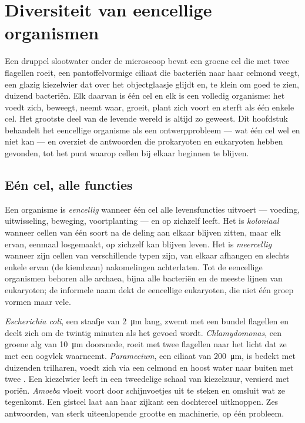 \chapter{Diversiteit van eencellige organismen}\label{ch:b2:unicellular-diversity}

Een druppel slootwater onder de microscoop bevat een groene cel die met
twee flagellen roeit, een pantoffelvormige ciliaat die bacteriën naar
haar celmond veegt, een glazig kiezelwier dat over het objectglaasje
glijdt en, te klein om goed te zien, duizend bacteriën. Elk daarvan is
één cel en elk is een volledig organisme: het voedt zich, beweegt,
neemt waar, groeit, plant zich voort en sterft als één enkele cel. Het
grootste deel van de levende wereld is altijd zo geweest. Dit
hoofdstuk behandelt het eencellige organisme als een ontwerpprobleem
--- wat één cel wel en niet kan --- en overziet de antwoorden die
prokaryoten en eukaryoten hebben gevonden, tot het punt waarop cellen
bij elkaar beginnen te blijven.

\section{Eén cel, alle functies}

\begin{definition}\label{def:b2:unicellular-diversity:unicellular}
Een organisme is \emph{eencellig} wanneer
één cel alle levensfuncties uitvoert --- voeding, uitwisseling,
beweging, voortplanting --- en op zichzelf leeft. Het is
\emph{koloniaal} wanneer cellen van één
soort na de deling aan elkaar blijven zitten, maar elk ervan, eenmaal
losgemaakt, op zichzelf kan blijven leven. Het is
\emph{meercellig} wanneer zijn cellen van
verschillende typen zijn, van elkaar afhangen en slechts enkele ervan
(de kiembaan) nakomelingen achterlaten. Tot de eencellige organismen
behoren alle archaea, bijna alle bacteriën en de meeste lijnen van
eukaryoten; de informele naam \emph{} dekt de eencellige
eukaryoten, die niet één groep vormen maar vele.
\end{definition}

\begin{example}\label{ex:b2:unicellular-diversity:drop}
\emph{Escherichia coli}, een staafje van \qty{2}{\micro m} lang,
zwemt met een bundel flagellen en deelt zich om de twintig minuten
als het gevoed wordt. \emph{Chlamydomonas}, een groene alg van
\qty{10}{\micro m} doorsnede, roeit met twee flagellen naar het licht
dat ze met een oogvlek waarneemt. \emph{Paramecium}, een ciliaat van
\qty{200}{\micro m}, is bedekt met duizenden trilharen, voedt zich via
een celmond en hoost water naar buiten met twee . Een kiezelwier leeft in een tweedelige schaal van
kiezelzuur, versierd met poriën. \emph{Amoeba} vloeit voort door
schijnvoetjes uit te steken en omsluit wat ze tegenkomt. Een gistcel
laat aan haar zijkant een dochtercel uitknoppen. Zes antwoorden, van
sterk uiteenlopende grootte en machinerie, op één probleem.
\end{example}

